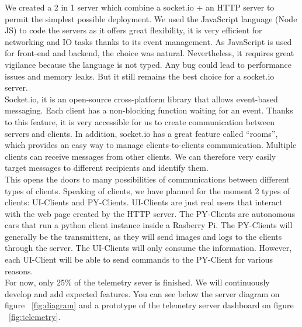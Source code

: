 \documentclass[12pt]{article}
\begin{document}
We created a 2 in 1 server which combine a socket.io + an HTTP server to permit the simplest possible deployment. We used the JavaScript language (Node JS) to code the servers as it offers great flexibility, it is very efficient for networking and IO tasks thanks to its event management. As JavaScript is used for front-end and backend, the choice was natural. Nevertheless, it requires great vigilance because the language is not typed. Any bug could lead to performance issues and memory leaks. But it still remains the best choice for a socket.io server. \\

Socket.io, it is an open-source cross-platform library that allows event-based messaging. Each client has a non-blocking function waiting for an event. Thanks to this feature, it is very accessible for us to create communication between servers and clients. In addition, socket.io has a great feature called “rooms”, which provides an easy way to manage clients-to-clients communication. Multiple clients can receive messages from other clients. We can therefore very easily target messages to different recipients and identify them. \\

This opens the doors to many possibilities of communications between different types of clients. Speaking of clients, we have planned for the moment 2 types of clients: UI-Clients and PY-Clients. UI-Clients are just real users that interact with the web page created by the HTTP server. The PY-Clients are autonomous cars that run a python client instance inside a Rasberry Pi. The PY-Clients will generally be the transmitters, as they will send images and logs to the clients through the server. The UI-Clients will only consume the information. However, each UI-Client will be able to send commands to the PY-Client for various reasons. \\

For now, only 25\% of the telemetry sever is finished. We will continuously develop and add expected features. You can see below the server diagram on figure ~\ref{fig:diagram} and a prototype of the telemetry server dashboard on figure ~\ref{fig:telemetry}.
\end{document}
